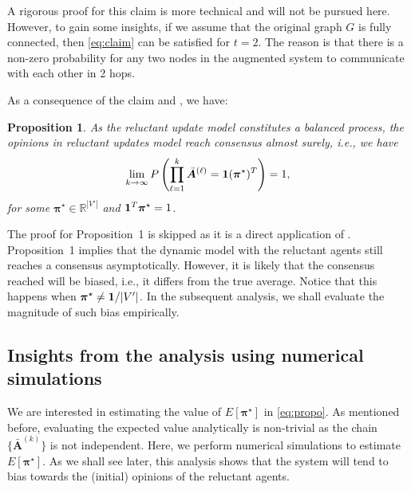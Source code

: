 \documentclass[letter]{article}
\newtheorem{prop}{Proposition}
\theoremstyle{remark}
\begin{document}
A rigorous proof for this claim is more technical and will not be pursued here. However, to gain some insights, if we assume that the original graph $G$ is fully connected, then \eqref{eq:claim} can be satisfied for $t = 2$. The reason is that there is a non-zero probability for any two nodes  in the augmented system to communicate with each other in 2 hops. 

As a consequence of the claim and \cite{Touri2014}, we have:
\begin{prop}
As the reluctant update model constitutes a balanced process, the opinions in reluctant updates model reach consensus almost surely, i.e., we have
\begin{equation} \label{eq:propo}
\lim_{k \rightarrow \infty} P \left( \prod_{\ell=1}^{k} \bar{\bm A}^{(\ell)} = {\bf 1} ({\bm \pi}^\star)^T \right) = 1,
\end{equation}
for some ${\bm \pi}^\star \in \mathbb{R}^{|V'|}$ and ${\bf 1}^T {\bm \pi}^\star = 1$.
\end{prop}

The proof for Proposition~1 is skipped as it is a direct application of \cite{Touri2014}.
Proposition~1 implies that the dynamic model with the reluctant agents still reaches a consensus asymptotically. However, it is likely that the consensus reached will be biased, i.e., it differs from the true average. Notice that this happens when ${\bm \pi}^\star \neq {\bf 1} / |V'|$. In the subsequent analysis, we shall evaluate the magnitude of such bias empirically. 


\subsection{Insights from the analysis using numerical simulations}
We are interested in estimating the value of $E [ \bm{\pi}^\star ]$ in \eqref{eq:propo}. As mentioned before, evaluating the expected value analytically is non-trivial as the chain $\{ \bar{\bm A}^{(k)} \}$ is not independent. Here, we perform numerical simulations to estimate $E [ \bm{\pi}^\star ]$. As we shall see later, this analysis shows that the system will tend to bias towards the (initial) opinions of the reluctant agents. 
\end{document}
